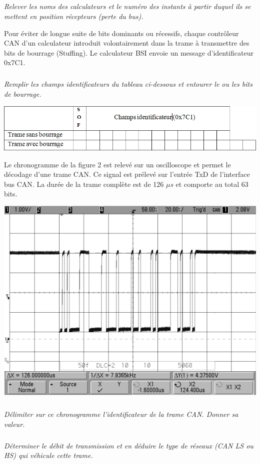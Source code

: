 \documentclass[10pt]{article}
\begin{document}
\subparagraph{}
\textit{Relever les noms des calculateurs et le numéro des instants à partir duquel ils se mettent en position récepteurs (perte du bus).}

Pour éviter de longue suite de bits dominants ou récessifs, chaque contrôleur CAN d’un calculateur introduit volontairement dans la trame à transmettre des bits de bourrage (Stuffing).  
Le calculateur BSI envoie un message d’identificateur 0x7C1. 

\subparagraph{}
\textit{Remplir les champs identificateurs du tableau ci-dessous et entourer le ou les bits de bourrage.}

\begin{center}
\includegraphics[width=.95\textwidth]{images/im_14}
\end{center}

Le chronogramme de la figure 2 est relevé sur un oscilloscope et permet le décodage d’une trame CAN. Ce signal est prélevé sur l’entrée TxD de l’interface bus CAN. La durée de la trame complète est de 126 $\mu s$ et  comporte au total 63 bits. 


\begin{center}
\includegraphics[width=.95\textwidth]{images/im_15}
\end{center}

\subparagraph{}
\textit{Délimiter sur ce chronogramme l’identificateur de la trame CAN. Donner sa valeur.}
\subparagraph{}
\textit{Déterminer le débit de transmission et en déduire le type de réseaux (CAN LS ou HS) qui véhicule cette trame.}
\end{document}
